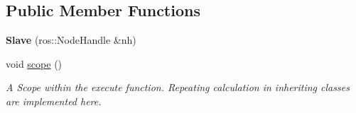 \subsection*{Public Member Functions}
\begin{DoxyCompactItemize}
\item 
{\bfseries Slave} (ros\+::\+Node\+Handle \&nh)\hypertarget{classSlave_a855a824b462dd05eddaa8d53b27faea4}{}\label{classSlave_a855a824b462dd05eddaa8d53b27faea4}

\item 
void \hyperlink{classSlave_a9b5d1d499c7bd05d5260fbe5b8afbbb5}{scope} ()\hypertarget{classSlave_a9b5d1d499c7bd05d5260fbe5b8afbbb5}{}\label{classSlave_a9b5d1d499c7bd05d5260fbe5b8afbbb5}

\begin{DoxyCompactList}\small\item\em A Scope within the execute function. Repeating calculation in inheriting classes are implemented here. \end{DoxyCompactList}\end{DoxyCompactItemize}
